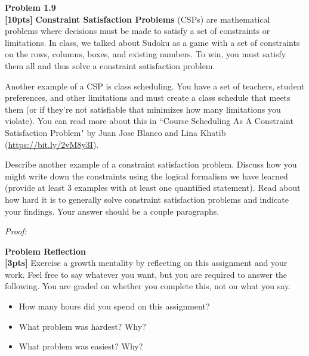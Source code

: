 \documentclass{article}
\newenvironment{problem}[2][Problem]
    { \begin{mdframed}[backgroundcolor=gray!20] \textbf{#1 #2} \\}
    {  \end{mdframed}}
\newenvironment{solution}
    {\textit{Proof:}}
    {}
\begin{document}
\begin{problem}{1.9}
\textbf{[10pts]} \textbf{Constraint Satisfaction Problems} (CSPs) are mathematical problems where decisions must be made to satisfy a set of constraints or limitations. In class, we talked about Sudoku as a game with a set of constraints on the rows, columns, boxes, and existing numbers. To win, you must satisfy them all and thus solve a constraint satisfaction problem. 

\vspace{1em}

Another example of a CSP is class scheduling. You have a set of teachers, student preferences, and other limitations and must create a class schedule that meets them (or if they're not satisfiable that minimizes how many limitations you violate). You can read more about this in ``Course Scheduling As A Constraint Satisfaction Problem" by Juan Jose Blanco and Lina Khatib (\url{https://bit.ly/2vM8y3I}). 

\vspace{1em}

Describe another example of a constraint satisfaction problem. Discuss how you might write down the constraints using the logical formalism we have learned (provide at least 3 examples with at least one quantified statement). Read about how hard it is to generally solve constraint satisfaction problems and indicate your findings. Your answer should be a couple paragraphs.
\end{problem}
\begin{solution}
\end{solution}
\vspace{4in} %

\begin{problem}{Reflection}
\textbf{[3pts]} Exercise a growth mentality by reflecting on this assignment and your work. Feel free to say whatever you want, but you are required to answer the following. You are graded on whether you complete this, not on what you say.
\begin{itemize}
\item How many hours did you spend on this assignment?
\item What problem was hardest? Why?
\item What problem was easiest? Why?
\end{itemize}
\end{problem}
\end{document}
